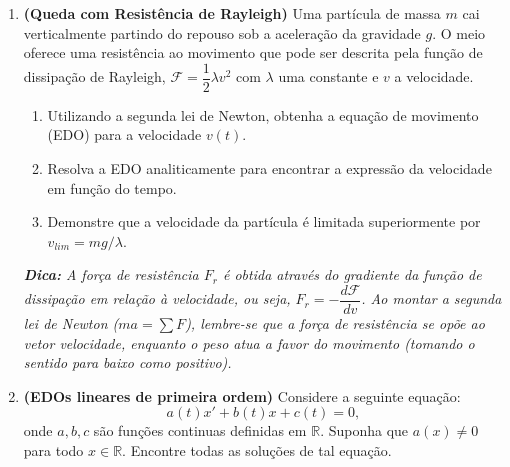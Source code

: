 \documentclass[a4paper,
11pt,  reqno]{amsart}
\begin{document}
\begin{enumerate}
\begin{enumerate}
    \item Encontre o fator integrante $\mu(t)$ associado a esta equação linear.
    
    \item Determine a solução particular $Q(t)$ considerando a condição inicial $Q(0) = 0$ e calcule a massa de sal presente no tanque após $50$ minutos.
\end{enumerate}

\medskip

\textit{\textbf{Dica:} O volume é variável, $V(t) = V_0 + \Delta r \cdot t$. A montagem da EDO baseia-se no princípio de que a taxa de variação da massa é igual à taxa de entrada menos a taxa de saída.}

\medskip

\item \textbf{(Queda com Resistência de Rayleigh)} Uma partícula de massa $m$ cai verticalmente partindo do repouso sob a aceleração da gravidade $g$. O meio oferece uma resistência ao movimento que pode ser descrita pela função de dissipação de Rayleigh, $\mathcal{F} = \dfrac{1}{2}\lambda v^2$ com $\lambda$ uma constante e $v$ a velocidade.

\begin{enumerate}
    \item Utilizando a segunda lei de Newton, obtenha a equação de movimento (EDO) para a velocidade $v(t)$.
    \item Resolva a EDO analiticamente para encontrar a expressão da velocidade em função do tempo.
    \item Demonstre que a velocidade da partícula é limitada superiormente por $v_{lim} = mg/\lambda$.
\end{enumerate}

\medskip

\textit{\textbf{Dica:} A força de resistência $F_r$ é obtida através do gradiente da função de dissipação em relação à velocidade, ou seja, $F_r = -\dfrac{d \mathcal{F}}{d v}$. Ao montar a segunda lei de Newton ($ma = \sum F$), lembre-se que a força de resistência se opõe ao vetor velocidade, enquanto o peso atua a favor do movimento (tomando o sentido para baixo como positivo).}

\medskip

\item \textbf{(EDOs lineares de primeira ordem)} Considere a seguinte equação:
\begin{equation*}
    a(t)x' + b(t)x + c(t) =0,
\end{equation*}
onde $a,b,c$ são funções continuas definidas em $\mathbb{R}.$ Suponha que $a(x) \neq 0$ para todo $x \in \mathbb{R}.$ Encontre todas as soluções de tal equação. 


\end{enumerate}
\end{document}
